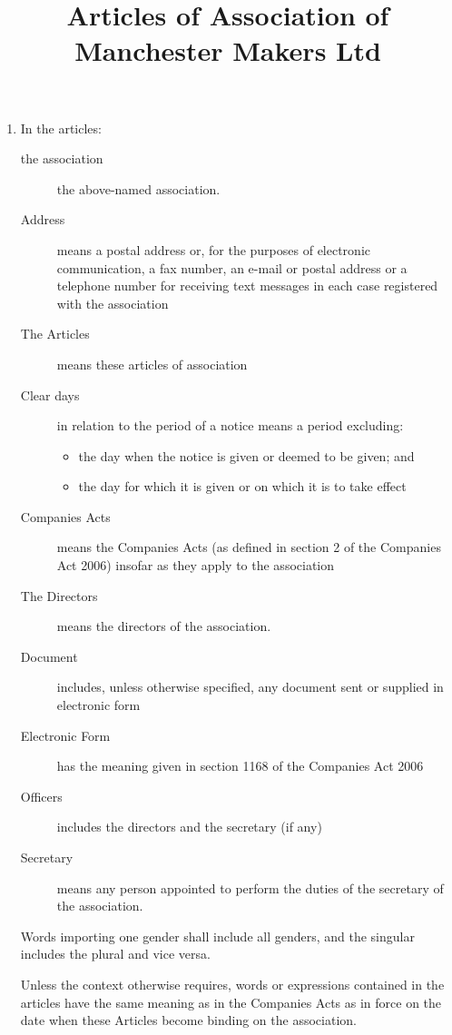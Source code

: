 \title{Articles of Association of Manchester Makers Ltd}
\begin{enumerate}
\section{Interpretation}
\item
  In the articles:
  \begin{description}
  \item[the association] the above-named association.
  \item[Address] means a postal address or, for the purposes of
    electronic communication, a fax number, an e-mail or postal address
    or a telephone number for receiving text messages in each case
    registered with the association
  \item[The Articles] means these articles of association
  \item[Clear days] in relation to the period of a notice means a period
    excluding:
    \begin{itemize}
    \item
      the day when the notice is given or deemed to be given; and
    \item
      the day for which it is given or on which it is to take effect
    \end{itemize}
  \item[Companies Acts] means the Companies Acts (as defined in section
    2 of the Companies Act 2006) insofar as they apply to the association
  \item[The Directors] means the directors of the association.
  \item[Document] includes, unless otherwise specified, any document sent or supplied in electronic form
  \item[Electronic Form] has the meaning given in section 1168 of the Companies Act 2006
  \item[Officers] includes the directors and the secretary (if any)
  \item[Secretary] means any person appointed to perform the duties of
    the secretary of the association.
  \end{description}
  Words importing one gender shall include all genders, and the singular
  includes the plural and vice versa.

  Unless the context otherwise requires, words or expressions
  contained in the articles have the same meaning as in the Companies
  Acts as in force on the date when these Articles become binding
  on the association.


\end{enumerate}
